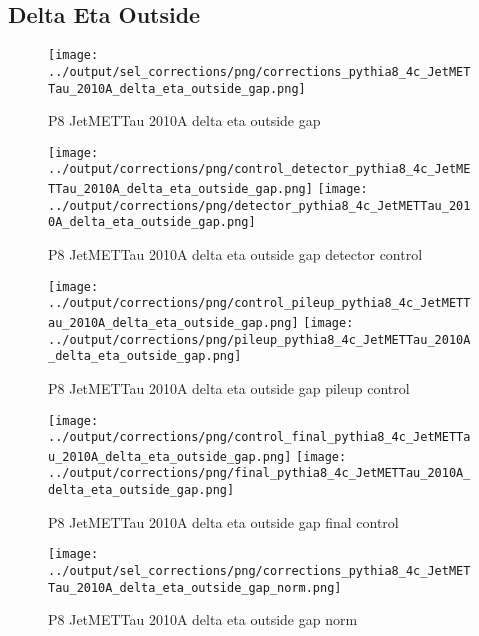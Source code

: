 \documentclass[11pt]{book}
\begin{document}
\clearpage
\subsection{Delta Eta Outside}
\begin{figure}[ht]
\centering
\texttt{[image: ../output/sel\_corrections/png/corrections\_pythia8\_4c\_JetMETTau\_2010A\_delta\_eta\_outside\_gap.png]}
\caption{P8 JetMETTau 2010A delta eta outside gap}
\label{fig:p8_JetMETTau_2010A_delta_eta_outside_gap}
\end{figure}

\begin{figure}[ht]
\centering
\texttt{[image: ../output/corrections/png/control\_detector\_pythia8\_4c\_JetMETTau\_2010A\_delta\_eta\_outside\_gap.png]}
\texttt{[image: ../output/corrections/png/detector\_pythia8\_4c\_JetMETTau\_2010A\_delta\_eta\_outside\_gap.png]}
\caption{P8 JetMETTau 2010A delta eta outside gap detector control}
\label{fig:p8_JetMETTau_2010A_delta_eta_outside_gap_detector_control}
\end{figure}

\begin{figure}[ht]
\centering
\texttt{[image: ../output/corrections/png/control\_pileup\_pythia8\_4c\_JetMETTau\_2010A\_delta\_eta\_outside\_gap.png]}
\texttt{[image: ../output/corrections/png/pileup\_pythia8\_4c\_JetMETTau\_2010A\_delta\_eta\_outside\_gap.png]}
\caption{P8 JetMETTau 2010A delta eta outside gap pileup control}
\label{fig:p8_JetMETTau_2010A_delta_eta_outside_gap_pileup_control}
\end{figure}


\begin{figure}[ht]
\centering
\texttt{[image: ../output/corrections/png/control\_final\_pythia8\_4c\_JetMETTau\_2010A\_delta\_eta\_outside\_gap.png]}
\texttt{[image: ../output/corrections/png/final\_pythia8\_4c\_JetMETTau\_2010A\_delta\_eta\_outside\_gap.png]}
\caption{P8 JetMETTau 2010A delta eta outside gap final control}
\label{fig:p8_JetMETTau_2010A_delta_eta_outside_gap_final_control}
\end{figure}



\begin{figure}[ht]
\centering
\texttt{[image: ../output/sel\_corrections/png/corrections\_pythia8\_4c\_JetMETTau\_2010A\_delta\_eta\_outside\_gap\_norm.png]}
\caption{P8 JetMETTau 2010A delta eta outside gap norm}
\label{fig:p8_JetMETTau_2010A_delta_eta_outside_gap_norm}
\end{figure}
\end{document}
